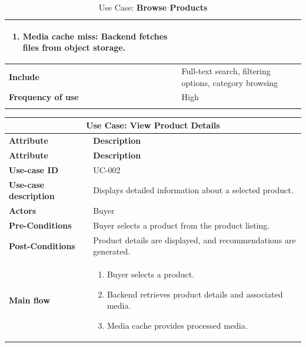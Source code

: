 \documentclass[12pt]{report}
\begin{document}
\begin{appendices}
\begin{longtable}[H]{|l|p{9cm}||}
\begin{enumerate}
			                                \item Media cache miss: Backend fetches files from object storage.
		                                \end{enumerate}                \\
		\hline
		\textbf{Include}              & Full-text search, filtering options, category browsing                           \\
		\hline
		\textbf{Frequency of use}     & High                                                                             \\
		\hline
		\hline
		\caption{Use Case: \textbf{Browse Products}}\label{tab:tableBrowseProducts}
	\end{longtable}


	\begin{longtable}[H]{|l|p{9cm}||}
		\hline
		\multicolumn{2}{|c||}{\textbf{Use Case: View Product Details}}                                        \\
		\hline
		\textbf{Attribute}            & \textbf{Description}                                                  \\
		\hline
		\endfirsthead
		\hline
		\textbf{Attribute}            & \textbf{Description}                                                  \\
		\hline
		\endhead
		\textbf{Use-case ID}          & UC-002                                                                \\
		\hline
		\textbf{Use-case description} & Displays detailed information about a selected product.               \\
		\hline
		\textbf{Actors}               & Buyer                                                                 \\
		\hline
		\textbf{Pre-Conditions}       & Buyer selects a product from the product listing.                     \\
		\hline
		\textbf{Post-Conditions}      & Product details are displayed, and recommendations are generated.     \\
		\hline
		\textbf{Main flow}            & \begin{enumerate}
			                                \item Buyer selects a product.
			                                \item Backend retrieves product details and associated media.
			                                \item Media cache provides processed media.

\end{enumerate}
\end{longtable}
\end{appendices}
\end{document}
